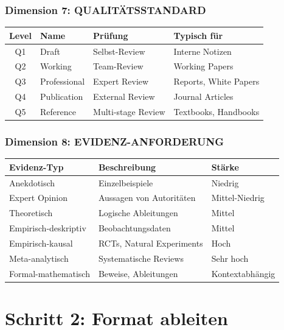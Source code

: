 \documentclass[12pt,a4paper]{article}
\begin{document}
\subsubsection{Dimension 7: QUALITÄTSSTANDARD}

\begin{table}[htbp]
\centering
\begin{tabular}{@{}clp{3cm}p{4cm}@{}}
\toprule
\textbf{Level} & \textbf{Name} & \textbf{Prüfung} & \textbf{Typisch für} \\
\midrule
Q1 & Draft & Selbst-Review & Interne Notizen \\
Q2 & Working & Team-Review & Working Papers \\
Q3 & Professional & Expert Review & Reports, White Papers \\
Q4 & Publication & External Review & Journal Articles \\
Q5 & Reference & Multi-stage Review & Textbooks, Handbooks \\
\bottomrule
\end{tabular}
\end{table}

\subsubsection{Dimension 8: EVIDENZ-ANFORDERUNG}

\begin{table}[htbp]
\centering
\begin{tabular}{@{}lp{5cm}l@{}}
\toprule
\textbf{Evidenz-Typ} & \textbf{Beschreibung} & \textbf{Stärke} \\
\midrule
Anekdotisch & Einzelbeispiele & Niedrig \\
Expert Opinion & Aussagen von Autoritäten & Mittel-Niedrig \\
Theoretisch & Logische Ableitungen & Mittel \\
Empirisch-deskriptiv & Beobachtungsdaten & Mittel \\
Empirisch-kausal & RCTs, Natural Experiments & Hoch \\
Meta-analytisch & Systematische Reviews & Sehr hoch \\
Formal-mathematisch & Beweise, Ableitungen & Kontextabhängig \\
\bottomrule
\end{tabular}
\end{table}


\section{Schritt 2: Format ableiten}
\end{document}

